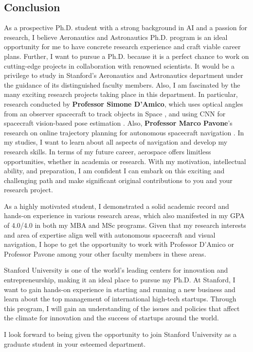 \documentclass[a4,25pt]{article}
\begin{document}
\begin{large}
\subsection{Conclusion}
\quad As a prospective Ph.D. student with a strong background in AI and a passion for research, I believe Aeronautics and Astronautics Ph.D. program is an ideal opportunity for me to have concrete research experience and craft viable career plans. Further, I want to pursue a Ph.D. because it is a perfect chance to work on cutting-edge projects in collaboration with renowned scientists. It would be a privilege to study in Stanford's Aeronautics and Astronautics department under the guidance of its distinguished faculty members. Also, I am fascinated by the many exciting research projects taking place in this department. In particular, research conducted by \textbf{Professor Simone D'Amico}, which uses optical angles from an observer spacecraft to track objects in Space \cite{kruger2021autonomous}, and using CNN for spacecraft vision-based pose estimation \cite{park2022adaptive}. Also, \textbf{Professor Marco Pavone}'s research on online trajectory planning for autonomous spacecraft navigation \cite{bonalli2019gusto}. In my studies, I want to learn about all aspects of navigation and develop my research skills. In terms of my future career, aerospace offers limitless opportunities, whether in academia or research. With my motivation, intellectual ability, and preparation, I am confident I can embark on this exciting and challenging path and make significant original contributions to you and your research project.\par
\vspace{-0.25cm} \quad As a highly motivated student, I demonstrated a solid academic record and hands-on experience in various research areas, which also manifested in my GPA of 4.0/4.0 in both my MBA and MSc programs. Given that my research interests and area of expertise align well with autonomous spacecraft and visual navigation, I hope to get the opportunity to work with Professor D'Amico or Professor Pavone among your other faculty members in these areas. \par
\vspace{-0.25cm} \quad Stanford University is one of the world's leading centers for innovation and entrepreneurship, making it an ideal place to pursue my Ph.D. At Stanford, I want to gain hands-on experience in starting and running a new business and learn about the top management of international high-tech startups. Through this program, I will gain an understanding of the issues and policies that affect the climate for innovation and the success of startups around the world. \par
\vspace{-0.25cm} \quad I look forward to being given the opportunity to join Stanford University as a graduate student in your esteemed department.\par


\end{large}
\end{document}
